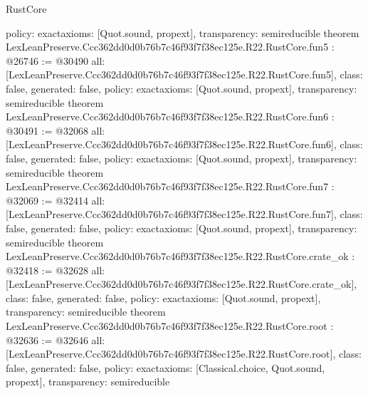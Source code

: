 \begin{lexlean}{RustCore}
\begin{coremodule}
{  policy: exact{axioms: [Quot.sound, propext]},
  transparency: semireducible
}
theorem LexLeanPreserve.Ccc362dd0d0b76b7c46f93f7f38ec125e.R22.RustCore.fun5 : @26746 := @30490 {
  all: [LexLeanPreserve.Ccc362dd0d0b76b7c46f93f7f38ec125e.R22.RustCore.fun5],
  class: false,
  generated: false,
  policy: exact{axioms: [Quot.sound, propext]},
  transparency: semireducible
}
theorem LexLeanPreserve.Ccc362dd0d0b76b7c46f93f7f38ec125e.R22.RustCore.fun6 : @30491 := @32068 {
  all: [LexLeanPreserve.Ccc362dd0d0b76b7c46f93f7f38ec125e.R22.RustCore.fun6],
  class: false,
  generated: false,
  policy: exact{axioms: [Quot.sound, propext]},
  transparency: semireducible
}
theorem LexLeanPreserve.Ccc362dd0d0b76b7c46f93f7f38ec125e.R22.RustCore.fun7 : @32069 := @32414 {
  all: [LexLeanPreserve.Ccc362dd0d0b76b7c46f93f7f38ec125e.R22.RustCore.fun7],
  class: false,
  generated: false,
  policy: exact{axioms: [Quot.sound, propext]},
  transparency: semireducible
}
theorem LexLeanPreserve.Ccc362dd0d0b76b7c46f93f7f38ec125e.R22.RustCore.crate_ok : @32418 := @32628 {
  all: [LexLeanPreserve.Ccc362dd0d0b76b7c46f93f7f38ec125e.R22.RustCore.crate_ok],
  class: false,
  generated: false,
  policy: exact{axioms: [Quot.sound, propext]},
  transparency: semireducible
}
theorem LexLeanPreserve.Ccc362dd0d0b76b7c46f93f7f38ec125e.R22.RustCore.root : @32636 := @32646 {
  all: [LexLeanPreserve.Ccc362dd0d0b76b7c46f93f7f38ec125e.R22.RustCore.root],
  class: false,
  generated: false,
  policy: exact{axioms: [Classical.choice, Quot.sound, propext]},
  transparency: semireducible
}


\end{coremodule}
\end{lexlean}
